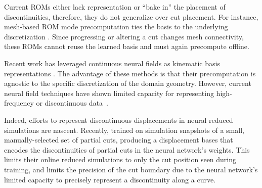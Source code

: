 Current ROMs either lack representation or ``bake in'' the placement of discontinuities, therefore, they do not generalize over cut placement. For instance,  mesh-based ROM mode precomputation ties the basis to the underlying discretization  \cite{sifakis2012fem,fulton2019latent,shen2021high}. Since progressing or altering a cut changes mesh connectivity, these ROMs cannot reuse the learned basis and must again precompute offline.


Recent work has leveraged continuous neural fields as kinematic basis representations \cite{pan2022neural,chen2023crom,puri2024snf,tao2024neural}. The advantage of these methods is that their precomputation is agnostic to the specific discretization of the domain geometry. However, current neural field techniques have shown limited capacity for representing high-frequency or discontinuous data~\cite{Belhe:2023:DiscontinuityAwareNeuralFields}.

Indeed, efforts to represent discontinuous displacements in neural reduced simulations are nascent. Recently, \citet{chang:2023:licrom} trained on simulation snapshots of a small, manually-selected set of partial cuts, producing a displacement bases that encodes the discontinuities of partial cuts in the neural network's weights. This limits their online reduced simulations to only the cut position seen during training, and limits the precision of the cut boundary due to the neural network's limited capacity to precisely represent a discontinuity along a curve.


%

